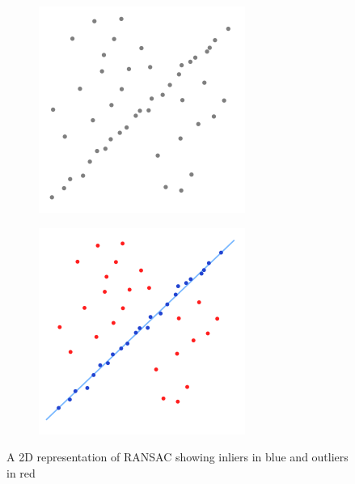 			\begin{figure}[H]
				\centering
				\begin{subfigure}{.5\textwidth}
					\centering
					\includegraphics[width=1\linewidth]{Includes/images/random_sample_example1}
					\label{fig:RANSAC1}
				\end{subfigure}%
				\begin{subfigure}{.5\textwidth}
					\centering
					\includegraphics[width=1\linewidth]{Includes/images/random_sample_example2}
					\label{fig:RANSAC2}
				\end{subfigure}
				\caption{A 2D representation of RANSAC showing inliers in blue and outliers in red}
			\end{figure} 
		 
